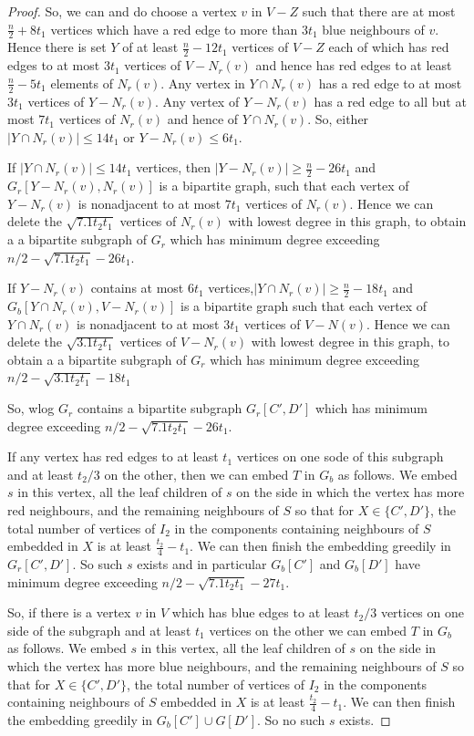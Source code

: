 \documentclass[10pt,a4paper]{amsart}
\begin{document}
\begin{proof}
So, we can and do choose  a vertex $v$ in $V-Z$ such that there are at most  
$\frac{n}{2}+8t_1$ vertices  which have a red edge to  more than $3t_1$ blue    neighbours of $v$.  
Hence there is set  $Y$ of at least $\frac{n}{2}-12t_1$ vertices of $V-Z$ each of which has red edges to at most $3t_1$
vertices of $V-N_r(v)$ and hence has red edges to at least 
$\frac{n}{2}-5t_1$ elements of $N_r(v)$. Any  vertex in $Y \cap N_r(v)$ has a red edge to   at most 
$3t_1$ vertices  of $Y-N_r(v)$. Any vertex of $Y-N_r(v)$ has a red edge 
to all but  at most $7t_1$ vertices of $N_r(v)$ and hence of $Y \cap N_r(v)$. So, either  $|Y \cap N_r(v)|\le 14t_1$
or $Y - N_r(v) \le 6t_1$.

If $|Y \cap N_r(v)| \le 14t_1$ vertices, then $| Y-N_r(v)| \ge \frac{n}{2}-26t_1$ and $G_r[Y-N_r(v),N_r(v)]$ 
is a bipartite graph, such that 
each vertex of $Y-N_r(v)$ is nonadjacent to at most $7t_1$ vertices of $N_r(v)$. Hence we can delete
the $\sqrt{7.1t_2t_1}$ vertices of $N_r(v)$ with lowest degree in this graph, to obtain a 
a bipartite subgraph  of $G_r$  which has minimum degree exceeding $n/2-\sqrt{7.1t_2t_1}-26t_1$.

If $Y - N_r(v)$ contains at most $6t_1$ vertices,$|Y \cap N_r(v)| \ge \frac{n}{2}-18t_1$ and   $ G_b [Y \cap N_r(v),V-N_r(v)]$ 
is a bipartite graph  such that 
each vertex of $Y \cap N_r(v)$ is nonadjacent to at most $3t_1$ vertices of $V-N(v)$. Hence we can delete
the $\sqrt{3.1t_2t_1}$ vertices of $V-N_r(v)$ with lowest degree in this graph, to obtain a 
a bipartite subgraph   of $G_r$ which has minimum degree exceeding $n/2-\sqrt{3.1t_2t_1}-18t_1$

So, wlog $G_r$ contains a bipartite subgraph $G_r[ C',D']$   which has minimum degree exceeding $n/2-\sqrt{7.1t_2t_1}-26t_1$.

If any vertex  has red edges to  at least $t_1$ vertices on one sode of this subgraph and at least $t_2/3$ on the other, then we can embed $T$ in $G_b$  as follows. We embed  $s$ in this vertex,  all the leaf 
children of $s$ on the  side in which the vertex  has  more red neighbours, and the remaining neighbours of $S$ so that  for $X \in \{C',D'\}$, the total number of vertices of $I_2$ 
in the components  containing neighbours of $S$  embedded  in $X$ is at least $\frac{t_2}{4}-t_1$.
We can then finish the embedding greedily in $G_r[C',D']$. So such $s$ exists and in particular 
 $G_b[C']$ and $G_b[D']$ have minimum degree exceeding $n/2-\sqrt{7.1t_2t_1}-27t_1$. %

So,  if there is  a vertex $v$ in $V$ which has blue edges to at least $t_2/3$ vertices on one side of the 
subgraph and  at least $t_1$ vertices on the other   we can embed $T$ in $G_b$ as follows. 
We embed $s$ in this vertex, all the leaf 
children of $s$ on the  side in which the vertex  has  more blue  neighbours, and the remaining neighbours of $S$ so that  for $X \in \{C',D'\}$, the total number of vertices of $I_2$ 
in the components  containing neighbours of $S$  embedded  in $X$ is at least $\frac{t_2}{4}-t_1$.
We can then finish the embedding greedily in $G_b[C'] 
\cup G[D']$. So no such $s$ exists.


\end{proof}
\end{document}
